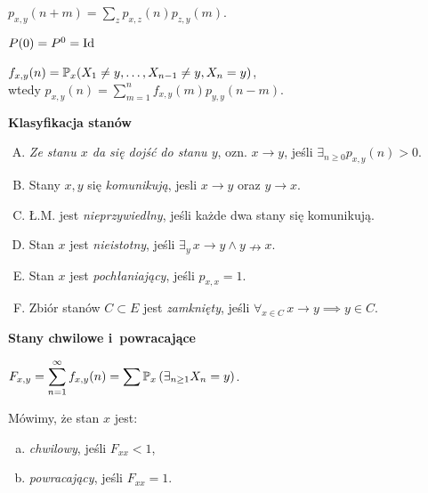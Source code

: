 	\begin{remark}
		$p_{x,y}(n+m) = \sum_z p_{x,z}(n) p_{z,y}(m)$.
	\end{remark}
	
	\begin{remark}
		$P(0) = P^0 = \mr{Id}$
	\end{remark}
	
	\begin{remark}
		$f_{x,y}(n) = \P_x(X_1 \neq y, \ldots, X_{n-1} \neq y, X_n = y)$, \\
		wtedy $p_{x,y}(n) = \sum_{m=1}^n f_{x,y}(m) p_{y,y}(n-m)$.
	\end{remark}
	
	\pagebreak
	
	{\bf Klasyfikacja stanów}
	\begin{definition}
		\begin{enumerate}[A.]
			\item \emph{Ze stanu $x$ da się dojść do stanu $y$},
			ozn. $x \to y$, jeśli $\exists_{n \geq 0} p_{x,y}(n) > 0$.
			\item Stany $x, y$ się \emph{komunikują},
			jesli $x \to y$ oraz $y \to x$.
			\item Ł.M. jest \emph{nieprzywiedlny}, 
			jeśli każde dwa stany się komunikują.
			\item Stan $x$ jest \emph{nieistotny}, jeśli
			$\exists_y\, x \to y \wedge y \nrightarrow x$.
			\item Stan $x$ jest \emph{pochłaniający}, jeśli
			$p_{x,x} = 1$.
			\item Zbiór stanów $C \subset E$ jest \emph{zamknięty},
			jeśli $\forall_{x \in C}\, x \to y \implies y \in C$.
		\end{enumerate}

	\end{definition}
	
	{\bf Stany chwilowe i~powracające}
	\begin{definition}
		$\displaystyle F_{x,y} = \sum_{n=1}^\infty f_{x,y}(n) 
		= \sum \P_x\left( \exists_{n \geq 1} X_n=y \right)$.
	\end{definition}
	
	\begin{definition}
		Mówimy, że stan $x$ jest:
		\begin{enumerate}[a)]
			\item \emph{chwilowy}, jeśli $F_{xx} < 1$,
			\item \emph{powracający}, jeśli $F_{xx} = 1$.
		\end{enumerate}

	\end{definition}
	
